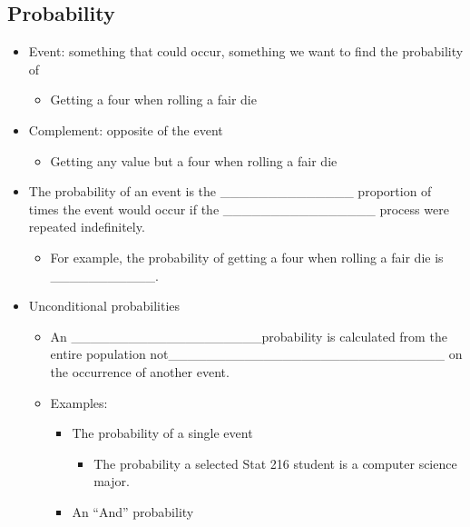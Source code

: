 \documentclass[
]{report}
\providecommand{\tightlist}{%
  \setlength{\itemsep}{0pt}\setlength{\parskip}{0pt}}
\begin{document}

\hypertarget{probability}{%
\subsection{Probability}\label{probability}}


\begin{itemize}
\item
  Event: something that could occur, something we want to find the probability of

  \begin{itemize}
  \tightlist
  \item
    Getting a four when rolling a fair die
  \end{itemize}
\item
  Complement: opposite of the event

  \begin{itemize}
  \tightlist
  \item
    Getting any value but a four when rolling a fair die
  \end{itemize}
\item
  The probability of an event is the \_\_\_\_\_\_\_\_\_\_\_\_\_\_ proportion of times the event would occur if the \_\_\_\_\_\_\_\_\_\_\_\_\_\_\_\_ process were repeated indefinitely.

  \begin{itemize}
  \tightlist
  \item
    For example, the probability of getting a four when rolling a fair die is \_\_\_\_\_\_\_\_\_\_\_.
  \end{itemize}
\item
  Unconditional probabilities

  \begin{itemize}
  \item
    An \_\_\_\_\_\_\_\_\_\_\_\_\_\_\_\_\_\_\_\_probability is calculated from the entire population not\_\_\_\_\_\_\_\_\_\_\_\_\_\_\_\_\_\_\_\_\_\_\_\_\_\_\_\_\_
    on the occurrence of another event.
  \item
    Examples:

    \begin{itemize}
    \item
      The probability of a single event

      \begin{itemize}
      \tightlist
      \item
        The probability a selected Stat 216 student is a computer science major.
      \end{itemize}
    \item
      An ``And'' probability


\end{itemize}
\end{itemize}
\end{itemize}
\end{document}
